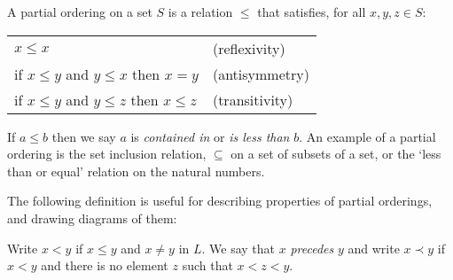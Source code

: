 
\begin{defn}
A partial ordering on a set $S$ is a relation $\le$ that satisfies, for all $x,y,z \in S$:
\begin{center}
\begin{tabular}{ll}
$x \le x$ & (reflexivity)\\
if $x \le y$ and $y \le x$ then $x = y$ & (antisymmetry) \\
if $x \le y$ and $y \le z$ then $x \le z$ & (transitivity)
\end{tabular}
\end{center}
\end{defn}
If $a \le b$ then we say $a$ is \emph{contained in} or \emph{is less than} $b$. An example of a partial ordering is the set inclusion relation, $\subseteq$ on a set of subsets of a set, or the `less than or equal' relation on the natural numbers.

The following definition is useful for describing properties of partial orderings, and drawing diagrams of them:
\begin{defn}
    Write $x < y$ if $x \le y$ and $x \neq y$ in $L$. We say that $x$ 
    \emph{precedes} $y$ and write $x \prec y$ if $x < y$ and there is no 
    element $z$ such that $x < z < y$.
\end{defn}

